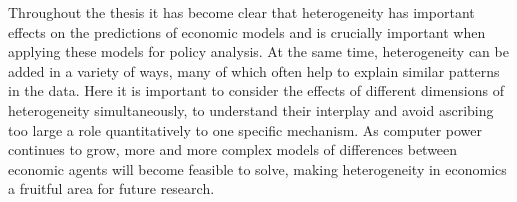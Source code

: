 Throughout the thesis it has become clear that heterogeneity has important effects
on the predictions of economic models and is crucially important when applying 
these models for policy analysis. At the same time, heterogeneity can be added
in a variety of ways, many of which often help to explain similar patterns in the
data. Here it is important to consider the effects of different dimensions of 
heterogeneity simultaneously, to understand their interplay and avoid ascribing
too large a role quantitatively to one specific mechanism. As computer power 
continues to grow, more and more complex models of differences between economic
agents will become feasible to solve, making heterogeneity in economics a fruitful
area for future research. 